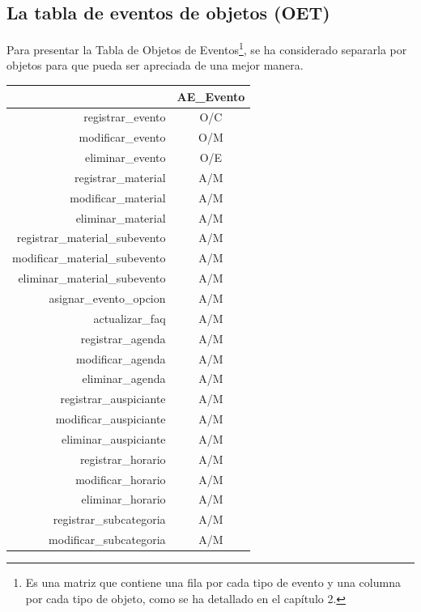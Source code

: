 \subsection{La tabla de eventos de objetos (OET)}
\begin{indentar}
Para presentar la Tabla de Objetos de Eventos\footnote{Es una matriz que contiene una fila por cada tipo de evento y una columna por cada tipo de objeto, como se ha detallado en el cap\'itulo 2.}, se ha considerado separarla por objetos para que pueda ser apreciada de una mejor manera.

\begin{table}
	\begin{center}
	\begin{tabular}{|r|c|}
		\hline
				& \textbf{AE\_Evento} \\
		\hline\hline
			registrar\_evento	& O/C \\
		\hline
			modificar\_evento	& O/M \\
		\hline
			eliminar\_evento	& O/E \\
		\hline
			registrar\_material	& A/M \\
		\hline
			modificar\_material	& A/M \\
		\hline
			eliminar\_material	& A/M \\
		\hline
			registrar\_material\_subevento	& A/M \\
		\hline
			modificar\_material\_subevento	& A/M \\
		\hline
			eliminar\_material\_subevento	& A/M \\
		\hline
			asignar\_evento\_opcion	& A/M \\
		\hline
			actualizar\_faq	& A/M \\
		\hline
			registrar\_agenda	& A/M \\
		\hline
			modificar\_agenda	& A/M \\
		\hline
			eliminar\_agenda	& A/M \\
		\hline
			registrar\_auspiciante	& A/M \\
		\hline
			modificar\_auspiciante	& A/M \\
		\hline
			eliminar\_auspiciante	& A/M \\
		\hline
			registrar\_horario	& A/M \\
		\hline
			modificar\_horario	& A/M \\
		\hline
			eliminar\_horario	& A/M \\
		\hline
			registrar\_subcategoria	& A/M \\
		\hline
			modificar\_subcategoria	& A/M \\

\end{tabular}
\end{center}
\end{table}
\end{indentar}
